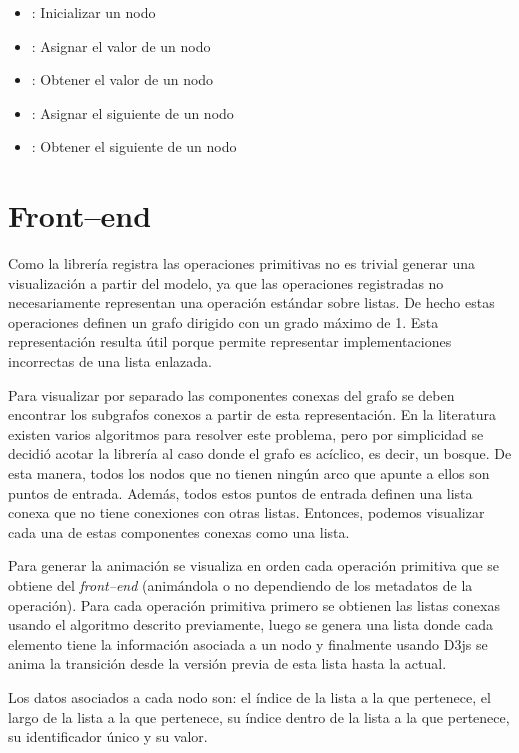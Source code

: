 \begin{itemize}
    \item{}: Inicializar un nodo
    \item{}: Asignar el valor de un nodo
    \item{}: Obtener el valor de un nodo
    \item{}: Asignar el siguiente de un nodo
    \item{}: Obtener el siguiente de un nodo
\end{itemize}

\section{Front--end}

Como la librería registra las operaciones primitivas no es trivial generar una visualización a partir del modelo, ya que las operaciones registradas no necesariamente representan una operación estándar sobre listas. De hecho estas operaciones definen un grafo dirigido con un grado máximo de 1. Esta representación resulta útil porque permite representar implementaciones incorrectas de una lista enlazada.

Para visualizar por separado las componentes conexas del grafo se deben encontrar los subgrafos conexos a partir de esta representación. En la literatura existen varios algoritmos para resolver este problema, pero por simplicidad se decidió acotar la librería al caso donde el grafo es acíclico, es decir, un bosque. De esta manera, todos los nodos que no tienen ningún arco que apunte a ellos son puntos de entrada. Además, todos estos puntos de entrada definen una lista conexa que no tiene conexiones con otras listas. Entonces, podemos visualizar cada una de estas componentes conexas como una lista.

Para generar la animación se visualiza en orden cada operación primitiva que se obtiene del \textit{front--end} (animándola o no dependiendo de los metadatos de la operación). Para cada operación primitiva primero se obtienen las listas conexas usando el algoritmo descrito previamente, luego se genera una lista donde cada elemento tiene la información asociada a un nodo y finalmente usando D3js se anima la transición desde la versión previa de esta lista hasta la actual.

Los datos asociados a cada nodo son: el índice de la lista a la que pertenece, el largo de la lista a la que pertenece, su índice dentro de la lista a la que pertenece, su identificador único y su valor.

